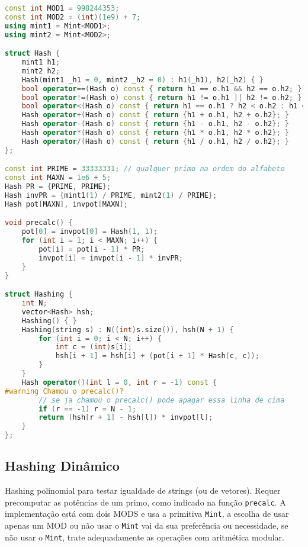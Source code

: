 \documentclass[10pt, a4paper, oneside]{book}
\begin{document}
\begin{lstlisting}[language=C++]
const int MOD1 = 998244353;
const int MOD2 = (int)(1e9) + 7;
using mint1 = Mint<MOD1>;
using mint2 = Mint<MOD2>;

struct Hash {
    mint1 h1;
    mint2 h2;
    Hash(mint1 _h1 = 0, mint2 _h2 = 0) : h1(_h1), h2(_h2) { }
    bool operator==(Hash o) const { return h1 == o.h1 && h2 == o.h2; }
    bool operator!=(Hash o) const { return h1 != o.h1 || h2 != o.h2; }
    bool operator<(Hash o) const { return h1 == o.h1 ? h2 < o.h2 : h1 < o.h1; }
    Hash operator+(Hash o) const { return {h1 + o.h1, h2 + o.h2}; }
    Hash operator-(Hash o) const { return {h1 - o.h1, h2 - o.h2}; }
    Hash operator*(Hash o) const { return {h1 * o.h1, h2 * o.h2}; }
    Hash operator/(Hash o) const { return {h1 / o.h1, h2 / o.h2}; }
};

const int PRIME = 33333331; // qualquer primo na ordem do alfabeto
const int MAXN = 1e6 + 5;
Hash PR = {PRIME, PRIME};
Hash invPR = {mint1(1) / PRIME, mint2(1) / PRIME};
Hash pot[MAXN], invpot[MAXN];

void precalc() {
    pot[0] = invpot[0] = Hash(1, 1);
    for (int i = 1; i < MAXN; i++) {
        pot[i] = pot[i - 1] * PR;
        invpot[i] = invpot[i - 1] * invPR;
    }
}

struct Hashing {
    int N;
    vector<Hash> hsh;
    Hashing() { }
    Hashing(string s) : N((int)s.size()), hsh(N + 1) {
        for (int i = 0; i < N; i++) {
            int c = (int)s[i];
            hsh[i + 1] = hsh[i] + (pot[i + 1] * Hash(c, c));
        }
    }
    Hash operator()(int l = 0, int r = -1) const {
#warning Chamou o precalc()?
        // se ja chamou o precalc() pode apagar essa linha de cima
        if (r == -1) r = N - 1;
        return (hsh[r + 1] - hsh[l]) * invpot[l];
    }
};
\end{lstlisting}
\hfill

\subsection{Hashing Dinâmico}


Hashing polinomial para testar igualdade de strings (ou de vetores). Requer precomputar as potências de um primo, como indicado na função \texttt{precalc}. A implementação está com dois MODS e usa a primitiva \texttt{Mint}, a escolha de usar apenas um MOD ou não usar o \texttt{Mint} vai da sua preferência ou necessidade, se não usar o \texttt{Mint}, trate adequadamente as operações com aritmética modular.
\end{document}
